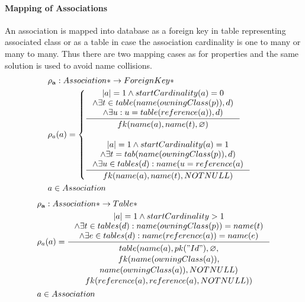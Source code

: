 \documentclass[11pt]{article}
\begin{document}
\paragraph{Mapping of Associations} An association is mapped into database as a foreign key in table representing associated class or as a table in case the association cardinality is one to many or many to many. Thus there are two mapping cases as for properties and the same solution is used to avoid name collisions.
\begin{align*}
&	\mathbf{\rho_a} : Association* \rightarrow ForeignKey* \\
&	\rho_a(a) = \begin{cases}
		\inference{|a| = 1 \wedge  startCardinality(a) = 0 \\ \wedge \exists t \in table(name(owningClass(p)), d) \\ \wedge \exists u : u = table(reference(a)), d)
		}{
			fk(name(a), name(t),  \varnothing) 
	 	}
  \\ \\
 	 \inference{|a| = 1 \wedge  startCardinality(a) = 1 \\ \wedge \exists t = tab(name(owningClass(p)), d) \\ \wedge \exists u \in tables(d) : name(u = reference(a)
 	 }{ 
		fk(name(a), name(t),  NOTNULL)
	}	 \end{cases}
\\
&	 a \in Association
\end{align*}
\begin{align*} 
&	\mathbf{\rho_a} : Association* \rightarrow Table* \\
&	\rho_a(a) =
		\inference{|a| = 1 \wedge   startCardinality > 1 \\ \wedge \exists t \in tables(d) : name(owningClass(p)) = name(t) \\ \wedge \exists e \in tables(d) : name(reference(a)) = name(e)
  		}{\begin{gathered}  
		 table(name(a), pk("Id"), \varnothing, \\ fk(name(owningClass(a)), \\ name(owningClass(a)), NOTNULL) \\ fk(reference(a), reference(a), NOTNULL)) 
  		\end{gathered}}  
\\
&	 a \in Association
\end{align*}
\end{document}
